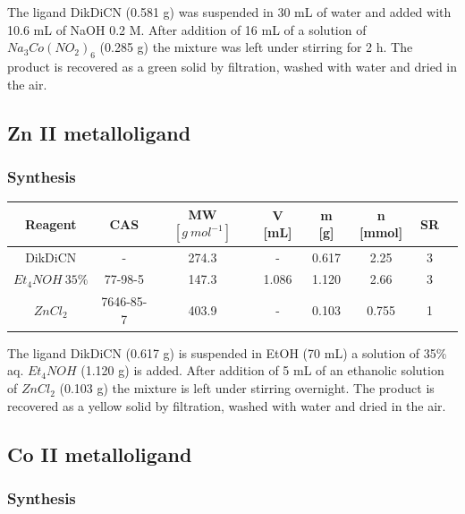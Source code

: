 \documentclass[../Master.tex]{subfiles}
\begin{document}
The ligand DikDiCN (0.581 g) was suspended in 30 mL of water and added with 10.6 mL of NaOH 0.2 M. After addition of 16 mL of a solution of $Na_{3}Co(NO_{2})_{6}$ (0.285 g) the mixture was left under stirring for 2 h. The product is recovered as a green solid by filtration, washed with water and dried in the air.

\subsection{Zn II metalloligand}

\subsubsection{Synthesis}

\begin{center}
	\begin{tabular}[b]{cccccccc}
		\toprule
		Reagent              & CAS       & MW \([g \ mol^{-1}]\) & V [mL] & m [g] & n [mmol] & SR \\
		\midrule
		DikDiCN              & -         & 274.3                 & -      & 0.617 & 2.25     & 3  \\
		\(Et_{4}NOH \ 35\%\) & 77-98-5   & 147.3                 & 1.086  & 1.120 & 2.66     & 3  \\
		$ZnCl_{2}$           & 7646-85-7 & 403.9                 & -      & 0.103 & 0.755    & 1  \\
		\bottomrule
	\end{tabular}
\end{center}

The ligand DikDiCN (0.617 g) is suspended in EtOH (70 mL) a solution of 35\% aq. \(Et_{4}NOH\) (1.120 g) is added. After addition of 5 mL of an ethanolic solution of \(ZnCl_2\) (0.103 g) the mixture is left under stirring overnight. The product is recovered as a yellow solid by filtration, washed with water and dried in the air.

\subsection{Co II metalloligand}

\subsubsection{Synthesis}
\end{document}
